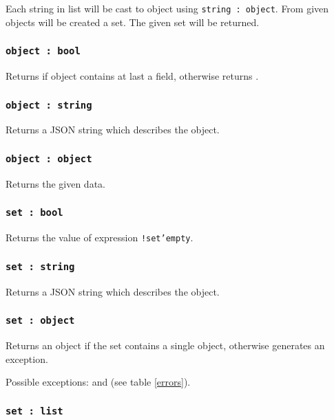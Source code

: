 Each string in list will be cast to object using \texttt{string : object}. From given objects will be created a set. The given set will be returned.

\subsubsection{\texttt{object : bool}}

Returns \true{} if object contains at last a field, otherwise returns \false.

\subsubsection{\texttt{object : string}}

Returns a JSON string which describes the object.

\subsubsection{\texttt{object : object}}

Returns the given data.

\subsubsection{\texttt{set : bool}}

Returns the value of expression \texttt{!set'empty}.

\subsubsection{\texttt{set : string}}

Returns a JSON string which describes the object.

\subsubsection{\texttt{set : object}}

Returns an object if the set contains a single object, otherwise generates an exception.

Possible exceptions:  and  (see table \ref{errors}).

\subsubsection{\texttt{set : list}}

